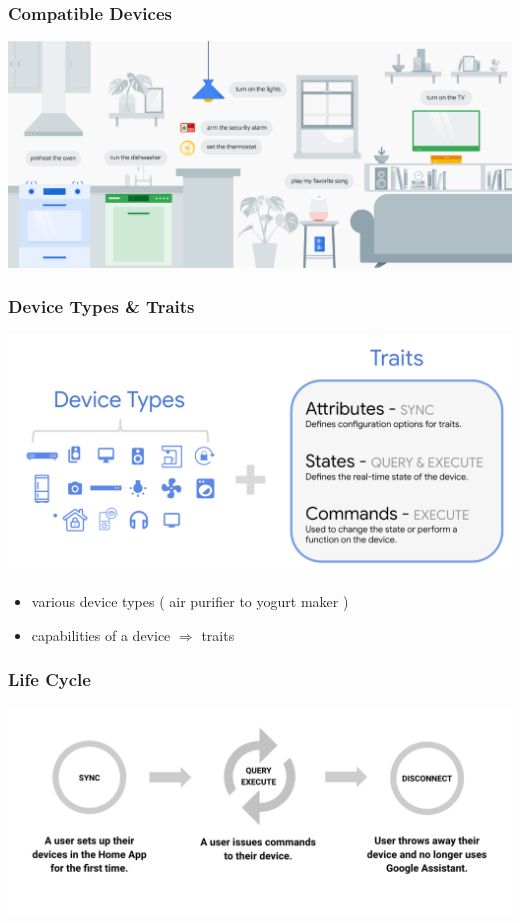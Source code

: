 \documentclass{beamer}
\begin{document}
\begin{frame}
\frametitle{Compatible Devices}
\begin{center}
\includegraphics[scale=0.30]{pictures/smart_home.png} 
\end{center}
\end{frame}

\begin{frame}
\frametitle{Device Types \& Traits}
\begin{center}
\includegraphics[scale=0.2]{pictures/state_commands.png} 
\end{center}
\begin{itemize}
\item various device types ( air purifier to yogurt maker )
\item capabilities of a device $\Rightarrow$ traits
\end{itemize}
\end{frame}

\begin{frame}
\frametitle{Life Cycle}
\begin{center}
\includegraphics[scale=0.22]{pictures/cycle.png}
\end{center}
\end{frame}
\end{document}
